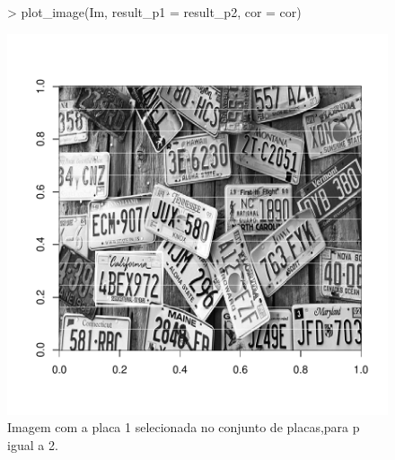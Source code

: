 \documentclass[12pt]{article}
\begin{document}
\begin{figure}
\centering
\begin{Schunk}
\begin{Sinput}
> plot_image(Im, result_p1 = result_p2, cor = cor)
\end{Sinput}
\end{Schunk}
\includegraphics{template_matching-009}
\caption{Imagem com a placa 1 selecionada no conjunto de placas,para p igual a 2.}
\label{placa1selecionada}
\end{figure}
\end{document}

